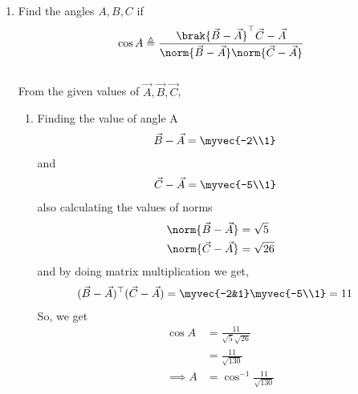 \documentclass[11pt]{book}
\begin{document}
\begin{enumerate}[label=\thesection.\arabic*.,ref=\thesection.\theenumi]
\item Find the angles $A, B, C$ if 
    \label{prop:angle2d}
  \begin{align}
    \label{eq:angle2d}
   \cos A \triangleq 
\frac{\brak{\vec{B}-\vec{A}}^{\top}{\vec{C}-\vec{A}}}{\norm{\vec{B}-\vec{A}}\norm{\vec{C}-\vec{A}}}
  \end{align}
\solution\\
From the given values of $\vec{A},\vec{B},\vec{C}$,\\
\begin{enumerate}
 \item Finding the value of angle A
\begin{align}
 \vec{B}-\vec{A} &=\myvec{-2\\1}
\end{align}
and 
\begin{align}
 \vec{C}-\vec{A} &= \myvec{-5\\1}
\end{align}
also calculating the values of norms
\begin{align}
 \norm{\vec{B}-\vec{A}} &= \sqrt{5}\\
 \norm{\vec{C}-\vec{A}} &= \sqrt{26}
\end{align}
and by doing matrix multiplication we get,
\begin{align}
\begin{split}
 (\vec{B}-\vec{A})^{\top}(\vec{C}-\vec{A}) &= \myvec{-2&1}\myvec{-5\\1} = 11
\end{split}
\end{align}
So, we get
\begin{align}
 \cos{A} &= \frac{11}{\sqrt{5} \sqrt{26}}\\
 &= \frac{11}{\sqrt{130}}\\
 \implies A& = \cos^{-1}{\frac{11}{\sqrt{130}}}
\end{align}


\end{enumerate}
\end{enumerate}
\end{document}
